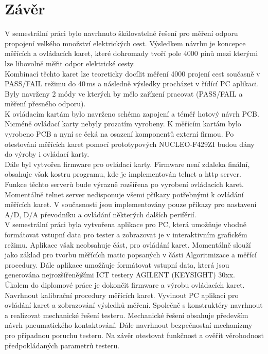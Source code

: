 \chapter*{Závěr}
{}

V semestrální práci bylo navrhnuto škálovatelné řešení pro měření
odporu propojení velkého množství elektrických cest. Výsledkem návrhu
je koncepce měřících a ovládacích karet, které dohromady tvoří pole 4000 pinů
mezi kterými lze libovolně měřit odpor elektrické cesty.\\

Kombinací těchto karet lze teoreticky docílit měření 4000 projení cest současně v PASS/FAIL režimu do 40\,ms
a následně výsledky procházet v řídící PC aplikaci.
Byly navrženy 2 módy ve kterých by mělo zařízení pracovat (PASS/FAIL a měření přesného odporu).\\

K ovládacím kartám bylo navrženo schéma zapojení a téměř hotový návrh PCB. Nicméně ovládací karty nebyly prozatím vyrobeny.
K měřícím kartám bylo vyrobeno PCB a nyní se čeká na osazení komponentů externí firmou.
Po otestování měřících karet pomocí prototypových NUCLEO-F429ZI budou dány do výroby i ovládací karty.\\

Dále byl vytvořen firmware pro ovládací karty. Firmware není zdaleka finální, obsahuje však kostru programu, kde
je implementován telnet a http server. Funkce těchto serverů bude výrazně rozšířena po vyrobení ovládacích karet.
Momentálně telnet server nedisponuje všemi příkazy potřebnými k ovládání měřících karet. V současnosti jsou implementovány
pouze příkazy pro nastavení A/D, D/A převodníku a ovládání některých dalších periférií.\\

V semestrální práci byla vytvořena aplikace pro PC, která umožňuje vhodně formátovat vstupní data pro tester a zobrazovat je 
v interaktivním grafickém režimu. 
Aplikace však neobsahuje část, pro ovládání karet. Momentálně slouží jako základ
pro tvorbu měřících matic popsaných v části Algoritmizace a měřící procedury. Dále aplikace
umožňuje formátovat vstupní data, která jsou generována nejrozšířenějšími ICT testery AGILENT (KEYSIGHT) 30xx.\\

Úkolem do diplomové práce je dokončit firmware a výrobu ovládacích karet. Navrhnout kalibrační procedury měřících karet.
Vyvinout PC aplikaci pro ovládání karet a zobrazování výsledků měření.
Společně s konstruktéry navrhnout a realizovat mechanické řešení testeru.
Mechanické řešení obsahuje především návrh pneumatického kontaktování.
Dále navrhnout bezpečnostní mechanizmy pro případnou poruchu testeru.
Na závěr otestovat funkčnost a ověřit věrohodnost předpokládaných parametrů testeru. 
